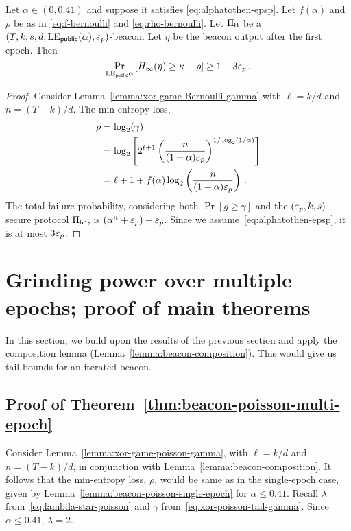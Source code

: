 \begin{lemma}\label{lemma:beacon-bernoulli-single-epoch}
  Let $\alpha \in (0, 0.41)$ and suppose it satisfies \eqref{eq:alphatothen-epsp}.
  Let $f(\alpha)$ and $\rho$ be as in \eqref{eq:f-bernoulli} and \eqref{eq:rho-bernoulli}.
  Let $\Pi_{\mathsf{B}}$ be a $(T,k,s,d,\mathrm{LE}_\mathsf{public}(\alpha), \mathsf{\varepsilon}_p)$-beacon.
  Let $\eta$ be the beacon output after the first epoch. 
  Then 
  \begin{equation}\label{eq:security-bernoulli-single-epoch}
    \Pr_{\mathrm{LE}_\mathsf{public}{\alpha}}\left[H_\infty(\eta) \geq \kappa - \rho \right] \geq 1 - 3 \mathsf{\varepsilon}_p
    \,.
  \end{equation}
\end{lemma}
\begin{proof}  
  Consider Lemma~\ref{lemma:xor-game-Bernoulli-gamma} 
  with $\ell = k/d$ and $n = (T-k)/d$. 
  The min-entropy loss, 
  \begin{align*}
    \rho &= \log_2(\gamma) \\
        &= \log_2 \left[  2^{\ell + 1} \left(
                \frac{n}{(1+\alpha)\mathsf{\varepsilon}_p}
            \right)^{1/\log_2(1/\alpha)}\right] \\
        &= \ell + 1 + f(\alpha) \log_2\left(\frac{n}{(1+\alpha)\mathsf{\varepsilon}_p}\right)
        \,.
  \end{align*}
  The total failure probability, 
  considering both $\Pr[g \geq \gamma]$ and 
  the $(\mathsf{\varepsilon}_p, k, s)$-secure protocol $\Pi_\mathsf{bc}$, 
  is $(\alpha^n + \mathsf{\varepsilon}_p) + \mathsf{\varepsilon}_p$. 
  Since we assume~\eqref{eq:alphatothen-epsp}, it is at most $3 \mathsf{\varepsilon}_p$.
\end{proof}



\section{Grinding power over multiple epochs; proof of main theorems}

In this section, we build upon the results of the previous section 
and apply the composition lemma (Lemma~\ref{lemma:beacon-composition}). 
This would give us tail bounds for an iterated beacon.



\subsection*{Proof of Theorem~\ref{thm:beacon-poisson-multi-epoch}}
  Consider Lemma~\ref{lemma:xor-game-poisson-gamma}, 
  with $\ell = k/d$ and $n = (T-k)/d$, 
  in conjunction with Lemma~\ref{lemma:beacon-composition}.
  It follows that the min-entropy loss, $\rho$, 
  would be same as in the single-epoch case, 
  given by Lemma~\ref{lemma:beacon-poisson-single-epoch} 
  for $\alpha \leq 0.41$. 
  Recall $\lambda$ from~\eqref{eq:lambda-star-poisson} and $\gamma$ from~\eqref{eq:xor-poisson-tail-gamma}.
  Since $\alpha \leq 0.41$, $\lambda = 2$.
  

